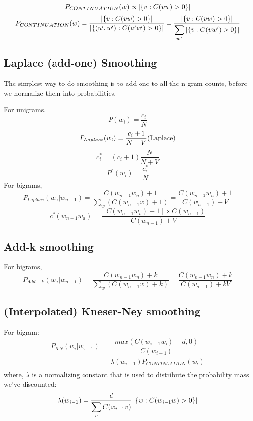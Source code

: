 \[
    P_{CONTINUATION}(w) \propto \left| \left\{v : C(vw) > 0\right\} \right|
\]
\[
    P_{CONTINUATION}(w) = \displaystyle\dfrac{\left| \left\{v : C(vw) > 0\right\} \right|}{\left| \left\{(u',w') : C(u'w') > 0\right\} \right| } = \displaystyle\dfrac{\left| \left\{v : C(vw) > 0\right\} \right|}{\displaystyle\sum_{w'} \left| \left\{v : C(vw') > 0\right\} \right|}
\]

\subsection{Laplace (add-one) Smoothing \cite{nlp-1}}
The simplest way to do smoothing is to add one to all the n-gram counts, before we normalize them into probabilities.

For unigrams,
\[
    P(w_i) = \displaystyle\dfrac{c_i}{N}
\]
\[
    P_{Laplace}(w_i) = \displaystyle\dfrac{c_i + 1}{N + V} \hfill \text{(Laplace)}
\]
\[
    c_i^* = (c_i +1)\displaystyle\dfrac{N}{N + V}
\]
\[
    P^*(w_i) = \displaystyle\dfrac{c_i^*}{N}
\]
For bigrams,
\[
    P_{Laplace}(w_n|w_{n-1}) = \displaystyle\dfrac{C(w_{n-1}w_n) + 1}{\sum_w (C(w_{n-1}w) + 1)} = \displaystyle\dfrac{C(w_{n-1}w_n) + 1}{C(w_{n-1}) + V} 
\]
\[
    c^*(w_{n-1}w_n) = \displaystyle\dfrac{[C(w_{n-1}w_n)+1] \times C(w_{n-1})}{C(w_{n-1}) + V} 
\]

\subsection{Add-k smoothing \cite{nlp-1}}

For bigrams,
\[
    P_{Add-k}(w_n|w_{n-1}) = \displaystyle\dfrac{C(w_{n-1}w_n) + k}{\sum_w (C(w_{n-1}w) + k)} = \displaystyle\dfrac{C(w_{n-1}w_n) + k}{C(w_{n-1}) + kV} 
\]

\subsection{(Interpolated) Kneser-Ney smoothing}

For bigram:
\begin{align*}
    P_{KN}(w_i|w_{i-1})  &= \displaystyle\dfrac{max(C(w_{i-1}w_i)-d,0)}{C(w_{i-1})} \\ 
    &+ \lambda (w_{i-1})P_{CONTINUATION}(w_i) \\ 
\end{align*}
where, $\lambda$ is a normalizing constant that is used to distribute the probability mass we’ve discounted:
\[
    \lambda(w_{i-1}) 
    = \displaystyle\dfrac{d}{\displaystyle\sum_v C(w_{i-1}v)} \left| \left\{w : C(w_{i-1}w) > 0\right\} \right|
\]

